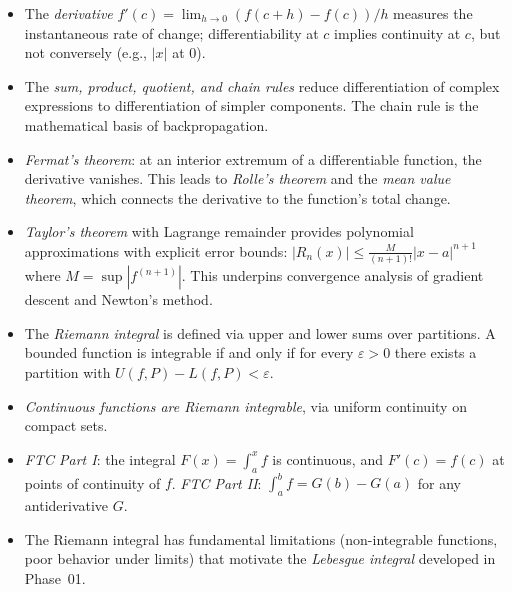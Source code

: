 \documentclass[11pt,a4paper]{article}
\begin{document}
\begin{itemize}
  \item The \emph{derivative} $f'(c) = \lim_{h \to 0}(f(c+h) - f(c))/h$
    measures the instantaneous rate of change; differentiability at $c$
    implies continuity at $c$, but not conversely (e.g., $|x|$ at $0$).

  \item The \emph{sum, product, quotient, and chain rules} reduce
    differentiation of complex expressions to differentiation of
    simpler components. The chain rule is the mathematical basis of
    backpropagation.

  \item \emph{Fermat's theorem}: at an interior extremum of a
    differentiable function, the derivative vanishes. This leads to
    \emph{Rolle's theorem} and the \emph{mean value theorem}, which
    connects the derivative to the function's total change.

  \item \emph{Taylor's theorem} with Lagrange remainder provides
    polynomial approximations with explicit error bounds:
    $|R_n(x)| \le \frac{M}{(n+1)!}|x - a|^{n+1}$ where
    $M = \sup |f^{(n+1)}|$. This underpins convergence analysis of
    gradient descent and Newton's method.

  \item The \emph{Riemann integral} is defined via upper and lower sums
    over partitions. A bounded function is integrable if and only if for
    every $\varepsilon > 0$ there exists a partition with
    $U(f,P) - L(f,P) < \varepsilon$.

  \item \emph{Continuous functions are Riemann integrable}, via uniform
    continuity on compact sets.

  \item \emph{FTC Part I}: the integral $F(x) = \int_a^x f$ is
    continuous, and $F'(c) = f(c)$ at points of continuity of $f$.
    \emph{FTC Part II}: $\int_a^b f = G(b) - G(a)$ for any
    antiderivative $G$.

  \item The Riemann integral has fundamental limitations (non-integrable
    functions, poor behavior under limits) that motivate the
    \emph{Lebesgue integral} developed in Phase~01.
\end{itemize}

\end{document}
